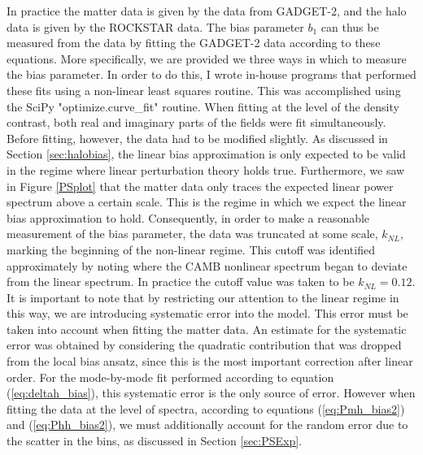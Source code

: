 \documentclass[10pt,letterpaper,final]{iopart}
\numberwithin{equation}{subsection}
\def\ni{\noindent}
\begin{document}
\ni In practice the matter data is given by the data from GADGET-2, and the halo data is given by the ROCKSTAR data. The bias parameter $b_1$ can thus be measured from the data by fitting the GADGET-2 data according to these equations. More specifically, we are provided we three ways in which to measure the bias parameter. In order to do this, I wrote in-house programs that performed these fits using a non-linear least squares routine. This was accomplished using the SciPy "optimize.curve\_fit" routine. When fitting at the level of the density contrast, both real and imaginary parts of the fields were fit simultaneously. Before fitting, however, the data had to be modified slightly. As discussed in Section \ref{sec:halobias}, the linear bias approximation is only expected to be valid in the regime where linear perturbation theory holds true. Furthermore, we saw in Figure \ref{PSplot} that the matter data only traces the expected linear power spectrum above a certain scale. This is the regime in which we expect the linear bias approximation to hold. Consequently, in order to make a reasonable measurement of the bias parameter, the data was truncated at some scale, $k_{NL}$, marking the beginning of the non-linear regime. This cutoff was identified approximately by noting where the CAMB nonlinear spectrum began to deviate from the linear spectrum. In practice the cutoff value was taken to be $k_{NL} = 0.12$. It is important to note that by restricting our attention to the linear regime in this way, we are introducing systematic error into the model. This error must be taken into account when fitting the matter data. An estimate for the systematic error was obtained by considering the quadratic contribution that was dropped from the local bias ansatz, since this is the most important correction after linear order. For the mode-by-mode fit performed according to equation (\ref{eq:deltah_bias}), this systematic error is the only source of error. However when fitting the data at the level of spectra, according to equations (\ref{eq:Pmh_bias2}) and (\ref{eq:Phh_bias2}), we must additionally account for the random error due to the scatter in the bins, as discussed in Section \ref{sec:PSExp}. 
\end{document}
